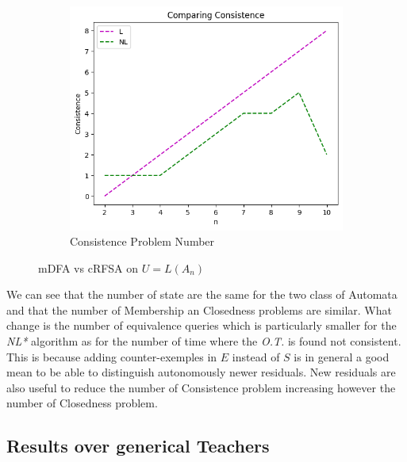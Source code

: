 \begin{figure}[!htb]
\begin{subfigure}[b]{0.3\textwidth}
    \label{fig:ClosednessWrostRFSACompare}
  \end{subfigure}
  \begin{subfigure}[b]{0.3\textwidth}
    \includegraphics[width=\textwidth]{../statistics/plots/wrostRFSA/Consistence.png}
    \caption{Consistence Problem Number}
    \label{fig:ConsistenceWrostRFSACompare}
  \end{subfigure}
  \caption{mDFA vs cRFSA on $U = L(A_n)$}
  \label{fig:wrostRFSA}
\end{figure}

We can see that the number of state are the same for the two class of Automata and that the number of Membership an Closedness problems are similar. What change is the number of equivalence queries which is particularly smaller for the \textit{NL*} algorithm as for the number of time where the \textit{O.T.} is found not consistent. This is because adding counter-exemples in $E$ instead of $S$ is in general a good mean to be able to distinguish autonomously newer residuals. New residuals are also useful to reduce the number of Consistence problem increasing however the number of Closedness problem.

\subsection{Results over generical Teachers}

